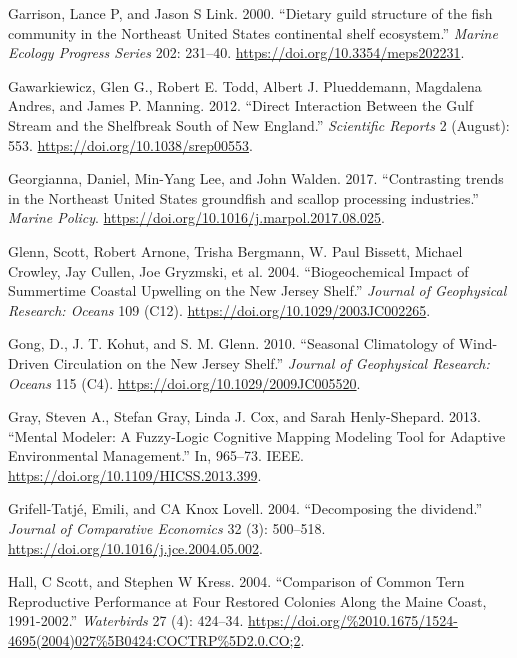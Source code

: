 \documentclass[
]{book}
\newlength{\cslhangindent}
\newenvironment{cslreferences}%
  {\setlength{\parindent}{0pt}%
  \everypar{\setlength{\hangindent}{\cslhangindent}}\ignorespaces}%
  {\par}
\begin{document}
\begin{cslreferences}
\leavevmode\hypertarget{ref-garrison2000dietary}{}%
Garrison, Lance P, and Jason S Link. 2000. ``Dietary guild structure of the fish community in the Northeast United States continental shelf ecosystem.'' \emph{Marine Ecology Progress Series} 202: 231--40. \url{https://doi.org/10.3354/meps202231}.

\leavevmode\hypertarget{ref-gawarkiewicz_direct_2012}{}%
Gawarkiewicz, Glen G., Robert E. Todd, Albert J. Plueddemann, Magdalena Andres, and James P. Manning. 2012. ``Direct Interaction Between the Gulf Stream and the Shelfbreak South of New England.'' \emph{Scientific Reports} 2 (August): 553. \url{https://doi.org/10.1038/srep00553}.

\leavevmode\hypertarget{ref-Georgianna2017}{}%
Georgianna, Daniel, Min-Yang Lee, and John Walden. 2017. ``Contrasting trends in the Northeast United States groundfish and scallop processing industries.'' \emph{Marine Policy}. \url{https://doi.org/10.1016/j.marpol.2017.08.025}.

\leavevmode\hypertarget{ref-glenn_biogeochemical_2004}{}%
Glenn, Scott, Robert Arnone, Trisha Bergmann, W. Paul Bissett, Michael Crowley, Jay Cullen, Joe Gryzmski, et al. 2004. ``Biogeochemical Impact of Summertime Coastal Upwelling on the New Jersey Shelf.'' \emph{Journal of Geophysical Research: Oceans} 109 (C12). \url{https://doi.org/10.1029/2003JC002265}.

\leavevmode\hypertarget{ref-gong_seasonal_2010}{}%
Gong, D., J. T. Kohut, and S. M. Glenn. 2010. ``Seasonal Climatology of Wind-Driven Circulation on the New Jersey Shelf.'' \emph{Journal of Geophysical Research: Oceans} 115 (C4). \url{https://doi.org/10.1029/2009JC005520}.

\leavevmode\hypertarget{ref-gray_mental_2013}{}%
Gray, Steven A., Stefan Gray, Linda J. Cox, and Sarah Henly-Shepard. 2013. ``Mental Modeler: A Fuzzy-Logic Cognitive Mapping Modeling Tool for Adaptive Environmental Management.'' In, 965--73. IEEE. \url{https://doi.org/10.1109/HICSS.2013.399}.

\leavevmode\hypertarget{ref-Grifell-Tatje2004}{}%
Grifell-Tatjé, Emili, and CA Knox Lovell. 2004. ``Decomposing the dividend.'' \emph{Journal of Comparative Economics} 32 (3): 500--518. \url{https://doi.org/10.1016/j.jce.2004.05.002}.

\leavevmode\hypertarget{ref-hall2004}{}%
Hall, C Scott, and Stephen W Kress. 2004. ``Comparison of Common Tern Reproductive Performance at Four Restored Colonies Along the Maine Coast, 1991-2002.'' \emph{Waterbirds} 27 (4): 424--34. \url{https://doi.org/\%2010.1675/1524-4695(2004)027\%5B0424:COCTRP\%5D2.0.CO;2}.


\end{cslreferences}
\end{document}
